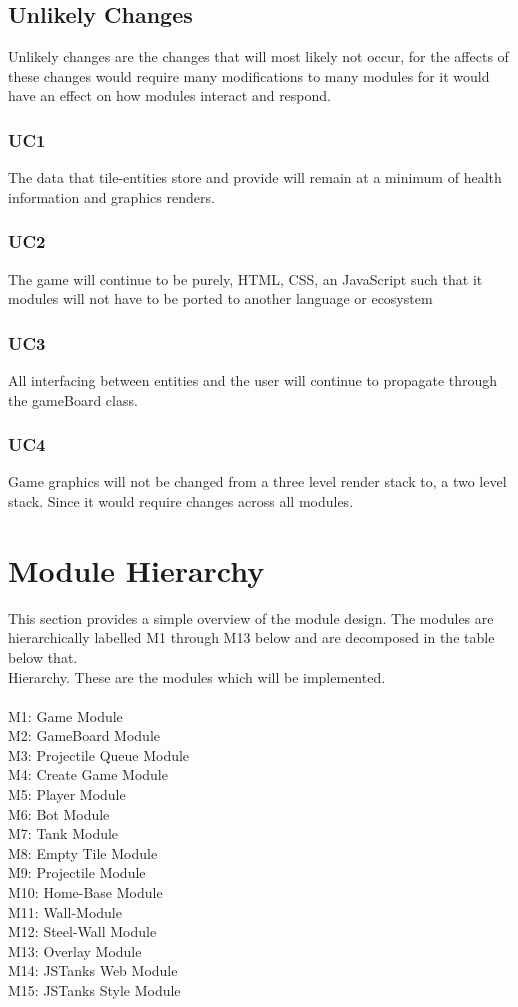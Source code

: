 \documentclass{article}
\begin{document}
\subsection{Unlikely Changes}
Unlikely changes are the changes that will most likely not occur, for the affects of these changes would require many modifications to many modules for it would have an effect on how modules interact and respond.
\subsubsection*{UC1}
The data that tile-entities store and provide will remain at a minimum of health information and graphics renders.
\subsubsection*{UC2}
The game will continue to be purely, HTML, CSS, an JavaScript such that it modules will not have to be ported to another language or ecosystem
\subsubsection*{UC3} 
All interfacing between entities and the user will continue to propagate through the gameBoard class.
\subsubsection*{UC4}
  Game graphics will not be changed from a three level render stack to, a two level stack. Since it would require changes across all modules.

\section{Module Hierarchy} \label{sec:Module_Hierarchy}
This section provides a simple overview of the module design. The modules are hierarchically labelled M1 through M13 below and are decomposed in the table below that. 
\\
Hierarchy. These are the modules which will be implemented.
\\ \\M1: Game Module
\\M2: GameBoard Module
\\M3: Projectile Queue Module
\\M4: Create Game Module
\\M5: Player Module
\\M6: Bot Module
\\M7: Tank Module
\\M8: Empty Tile Module
\\M9: Projectile Module
\\M10: Home-Base Module
\\M11: Wall-Module
\\M12: Steel-Wall Module
\\M13: Overlay Module
\\M14: JSTanks Web Module
\\M15: JSTanks Style Module
\end{document}
